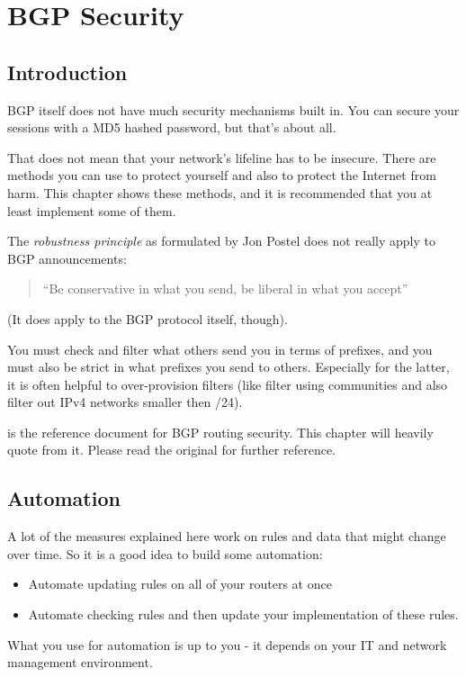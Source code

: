 \chapter{BGP Security}
\label{ch:security}
\section{Introduction}
BGP itself does not have much security mechanisms built in. You can secure your sessions with a \gls{MD5} hashed password, but that's about all.

That does not mean that your network's lifeline has to be insecure. There are methods you can use to protect yourself and also to protect the Internet from harm. This chapter shows these methods, and it is recommended that you at least implement some of them.

The \emph{robustness principle} as formulated by Jon Postel does not really apply to BGP announcements:
\begin{quote}
  ``Be conservative in what you send, be liberal in what you accept''
\end{quote}
(It does apply to the BGP protocol itself, though).

You must check and filter what others send you in terms of prefixes, and you must also be strict in what prefixes you send to others. Especially for the latter, it is often helpful to over-provision filters (like filter using communities and also filter out IPv4 networks smaller then /24).

 is the reference document for BGP routing security. This chapter will heavily quote from it. Please read the original for further reference.

\section{Automation}
A lot of the measures explained here work on rules and data that might change over time. So it is a good idea to build some automation:
\begin{itemize}
  \item Automate updating rules on all of your routers at once
  \item Automate checking rules and then update your implementation of these rules.
\end{itemize}
What you use for automation is up to you - it depends on your IT and network management environment.

